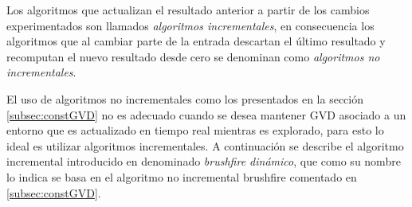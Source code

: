 Los algoritmos que actualizan el resultado anterior a partir de los cambios experimentados son llamados \emph{algoritmos incrementales}, en consecuencia los algoritmos que al cambiar parte de la entrada descartan el último resultado y recomputan el nuevo resultado desde cero se denominan como \emph{algoritmos no incrementales}.

El uso de algoritmos no incrementales como los presentados en la sección \ref{subsec:constGVD} no es adecuado cuando se desea mantener GVD asociado a un entorno que es actualizado en tiempo real mientras es explorado, para esto lo ideal es utilizar algoritmos incrementales. A continuación se describe el algoritmo incremental introducido en \cite{kalra2009incremental} denominado \emph{brushfire dinámico}, que como su nombre lo indica se basa en el algoritmo no incremental brushfire comentado en \ref{subsec:constGVD}.



